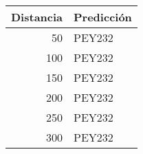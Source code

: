 \begin{tabular}{rl}
    \toprule
    Distancia & Predicción \\
    \midrule
    50        & PEY232     \\
    100       & PEY232     \\
    150       & PEY232     \\
    200       & PEY232     \\
    250       & PEY232     \\
    300       & PEY232     \\
    \bottomrule
\end{tabular}
